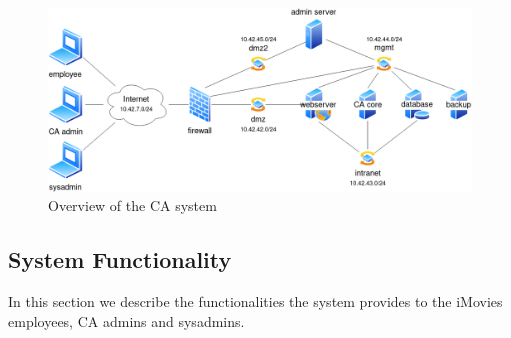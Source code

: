 \documentclass[english]{article}
\begin{document}
\begin{figure}
  \includegraphics[width=\textwidth]{diagram.png}
  \caption{Overview of the CA system}
  \label{overview}
\end{figure}



\subsection{System Functionality}

In this section we describe the functionalities the system provides to the iMovies employees, CA admins and sysadmins.
\end{document}
